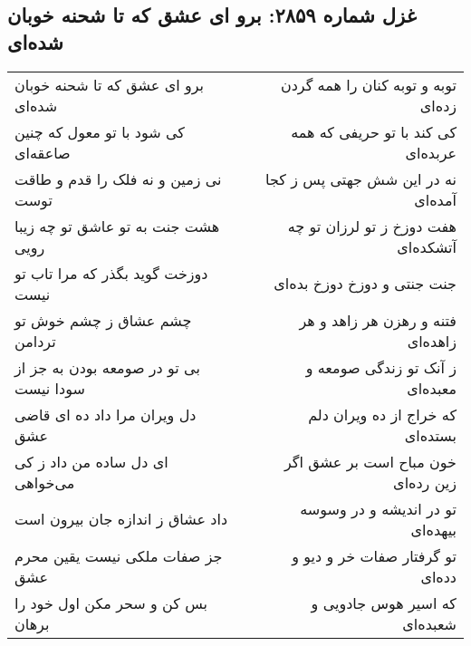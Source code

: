 \begin{center}
\section*{غزل شماره ۲۸۵۹: برو ای عشق که تا شحنه خوبان شده‌ای}
\label{sec:2859}
\begin{longtable}{l p{0.5cm} r}
برو ای عشق که تا شحنه خوبان شده‌ای
&&
توبه و توبه کنان را همه گردن زده‌ای
\\
کی شود با تو معول که چنین صاعقه‌ای
&&
کی کند با تو حریفی که همه عربده‌ای
\\
نی زمین و نه فلک را قدم و طاقت توست
&&
نه در این شش جهتی پس ز کجا آمده‌ای
\\
هشت جنت به تو عاشق تو چه زیبا رویی
&&
هفت دوزخ ز تو لرزان تو چه آتشکده‌ای
\\
دوزخت گوید بگذر که مرا تاب تو نیست
&&
جنت جنتی و دوزخ دوزخ بده‌ای
\\
چشم عشاق ز چشم خوش تو تردامن
&&
فتنه و رهزن هر زاهد و هر زاهده‌ای
\\
بی تو در صومعه بودن به جز از سودا نیست
&&
ز آنک تو زندگی صومعه و معبده‌ای
\\
دل ویران مرا داد ده ای قاضی عشق
&&
که خراج از ده ویران دلم بستده‌ای
\\
ای دل ساده من داد ز کی می‌خواهی
&&
خون مباح است بر عشق اگر زین رده‌ای
\\
داد عشاق ز اندازه جان بیرون است
&&
تو در اندیشه و در وسوسه بیهده‌ای
\\
جز صفات ملکی نیست یقین محرم عشق
&&
تو گرفتار صفات خر و دیو و دده‌ای
\\
بس کن و سحر مکن اول خود را برهان
&&
که اسیر هوس جادویی و شعبده‌ای
\\
\end{longtable}
\end{center}
